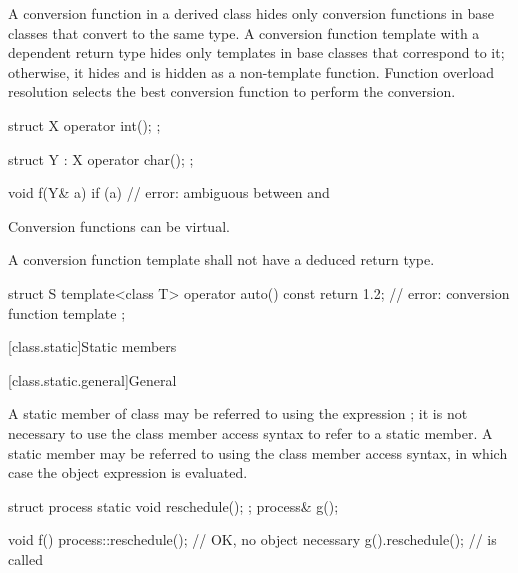 \pnum
{}%
\begin{note}
A conversion function in a derived class hides only
conversion functions in base classes that convert to the same type.
A conversion function template with a dependent return type hides only
templates in base classes that correspond to it;
otherwise, it hides and is hidden as a non-template function.
Function overload resolution selects
the best conversion function to perform the conversion.
\begin{example}
\begin{codeblock}
struct X {
  operator int();
};

struct Y : X {
    operator char();
};

void f(Y& a) {
  if (a) {          // error: ambiguous between  and 
  }
}
\end{codeblock}
\end{example}
\end{note}

\pnum
{}%
Conversion functions can be virtual.

\pnum
{}%
A conversion function template shall not have a
deduced return type.
\begin{example}
\begin{codeblock}
struct S {
  template<class T>
  operator auto() const { return 1.2; }     // error: conversion function template
};
\end{codeblock}
\end{example}

[class.static]{Static members}%

[class.static.general]{General}%
%

\pnum
A static member  of class  may be referred to
using the  expression ; it is not
necessary to use the class member access syntax to
refer to a static member. A static member may be
referred to using the class member access syntax, in which case the
object expression is evaluated.
\begin{example}
\begin{codeblock}
struct process {
  static void reschedule();
};
process& g();

void f() {
  process::reschedule();        // OK, no object necessary
  g().reschedule();             //  is called
}
\end{codeblock}
\end{example}

